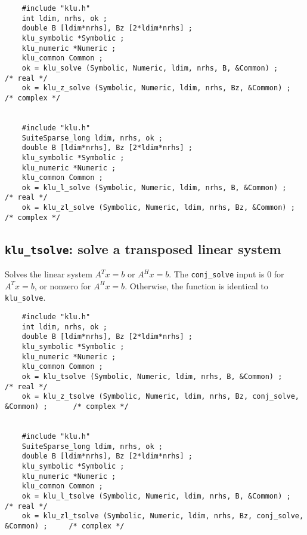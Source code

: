 \documentclass[11pt]{article}
\begin{document}
{\footnotesize
\begin{verbatim}
    #include "klu.h"
    int ldim, nrhs, ok ;
    double B [ldim*nrhs], Bz [2*ldim*nrhs] ;
    klu_symbolic *Symbolic ;
    klu_numeric *Numeric ;
    klu_common Common ;
    ok = klu_solve (Symbolic, Numeric, ldim, nrhs, B, &Common) ;                      /* real */
    ok = klu_z_solve (Symbolic, Numeric, ldim, nrhs, Bz, &Common) ;                   /* complex */


    #include "klu.h"
    SuiteSparse_long ldim, nrhs, ok ;
    double B [ldim*nrhs], Bz [2*ldim*nrhs] ;
    klu_symbolic *Symbolic ;
    klu_numeric *Numeric ;
    klu_common Common ;
    ok = klu_l_solve (Symbolic, Numeric, ldim, nrhs, B, &Common) ;                    /* real */
    ok = klu_zl_solve (Symbolic, Numeric, ldim, nrhs, Bz, &Common) ;                  /* complex */
\end{verbatim}
}

\subsection{{\tt klu\_tsolve}: solve a transposed linear system}

Solves the linear system $A^Tx=b$ or $A^Hx=b$.  The {\tt conj\_solve} input
is 0 for $A^Tx=b$, or nonzero for $A^Hx=b$.  Otherwise, the function is
identical to {\tt klu\_solve}.


{\footnotesize
\begin{verbatim}
    #include "klu.h"
    int ldim, nrhs, ok ;
    double B [ldim*nrhs], Bz [2*ldim*nrhs] ;
    klu_symbolic *Symbolic ;
    klu_numeric *Numeric ;
    klu_common Common ;
    ok = klu_tsolve (Symbolic, Numeric, ldim, nrhs, B, &Common) ;                     /* real */
    ok = klu_z_tsolve (Symbolic, Numeric, ldim, nrhs, Bz, conj_solve, &Common) ;      /* complex */


    #include "klu.h"
    SuiteSparse_long ldim, nrhs, ok ;
    double B [ldim*nrhs], Bz [2*ldim*nrhs] ;
    klu_symbolic *Symbolic ;
    klu_numeric *Numeric ;
    klu_common Common ;
    ok = klu_l_tsolve (Symbolic, Numeric, ldim, nrhs, B, &Common) ;                   /* real */
    ok = klu_zl_tsolve (Symbolic, Numeric, ldim, nrhs, Bz, conj_solve, &Common) ;     /* complex */
\end{verbatim}
}


\end{document}
